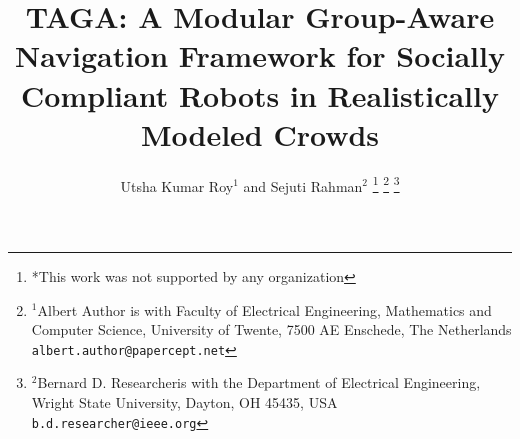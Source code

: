 \documentclass[journal]{IEEEtran}
\title{TAGA: A Modular Group-Aware Navigation Framework for Socially Compliant Robots in Realistically Modeled Crowds}
\author{Utsha Kumar Roy$^{1}$ and Sejuti Rahman$^{2}$%
\thanks{*This work was not supported by any organization}%
\thanks{$^{1}$Albert Author is with Faculty of Electrical Engineering, Mathematics and Computer Science,
        University of Twente, 7500 AE Enschede, The Netherlands
        {\tt\small albert.author@papercept.net}}%
\thanks{$^{2}$Bernard D. Researcheris with the Department of Electrical Engineering, Wright State University,
        Dayton, OH 45435, USA
        {\tt\small b.d.researcher@ieee.org}}%
}
\begin{document}
\maketitle
\thispagestyle{empty}
\pagestyle{empty}


\begin{abstract}



\end{abstract}






% 



\addtolength{\textheight}{-12cm}   %

















\end{document}
